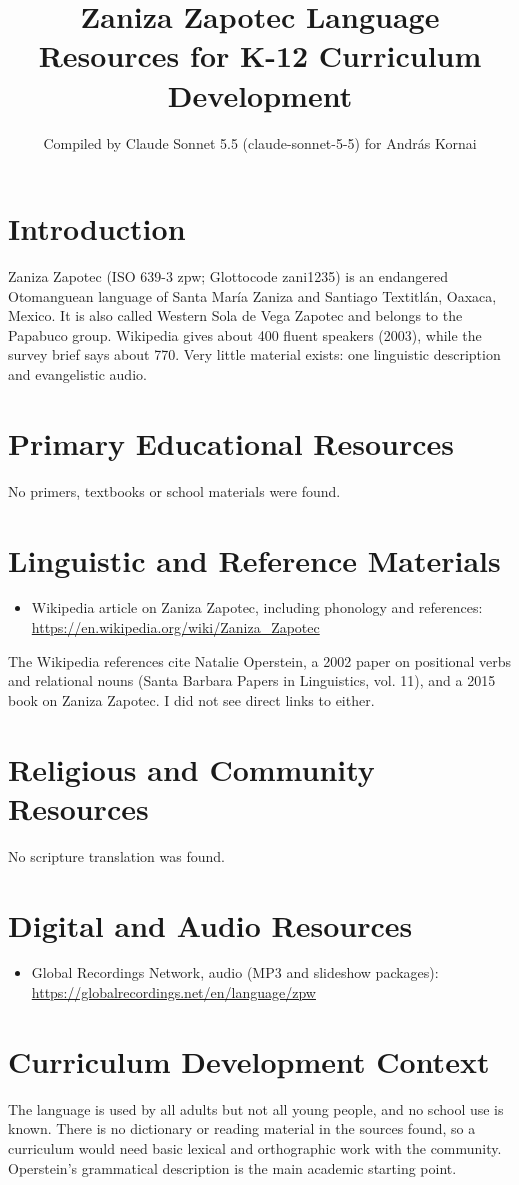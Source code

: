 \documentclass[12pt]{article}
\title{Zaniza Zapotec Language Resources for K-12 Curriculum Development}
\author{Compiled by Claude Sonnet 5.5 (claude-sonnet-5-5) for Andr\'as Kornai}
\date{}
\begin{document}
\maketitle

\section{Introduction}
Zaniza Zapotec (ISO 639-3 zpw; Glottocode zani1235) is an endangered Otomanguean language of Santa Mar\'ia Zaniza and Santiago Textitl\'an, Oaxaca, Mexico. It is also called Western Sola de Vega Zapotec and belongs to the Papabuco group. Wikipedia gives about 400 fluent speakers (2003), while the survey brief says about 770. Very little material exists: one linguistic description and evangelistic audio.

\section{Primary Educational Resources}
No primers, textbooks or school materials were found.

\section{Linguistic and Reference Materials}
\begin{itemize}
\item Wikipedia article on Zaniza Zapotec, including phonology and references: \url{https://en.wikipedia.org/wiki/Zaniza_Zapotec}
\end{itemize}
The Wikipedia references cite Natalie Operstein, a 2002 paper on positional verbs and relational nouns (Santa Barbara Papers in Linguistics, vol. 11), and a 2015 book on Zaniza Zapotec. I did not see direct links to either.

\section{Religious and Community Resources}
No scripture translation was found.

\section{Digital and Audio Resources}
\begin{itemize}
\item Global Recordings Network, audio (MP3 and slideshow packages): \url{https://globalrecordings.net/en/language/zpw}
\end{itemize}

\section{Curriculum Development Context}
The language is used by all adults but not all young people, and no school use is known. There is no dictionary or reading material in the sources found, so a curriculum would need basic lexical and orthographic work with the community. Operstein's grammatical description is the main academic starting point.
\end{document}
